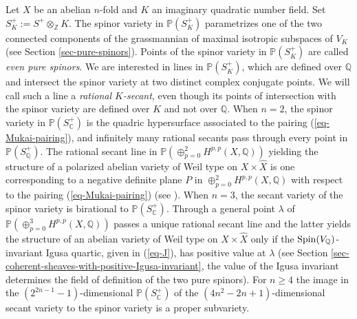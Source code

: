 \documentclass[12pt]{amsart}
\numberwithin{equation}{subsection}
\theoremstyle{plain}
\theoremstyle{definition}
\newcommand{\CC}{{\mathbb C}}
\newcommand{\QQ}{{\mathbb Q}}
\newcommand{\ZZ}{{\mathbb Z}}
\newcommand{\PP}{{\mathbb P}}
\newcommand{\Spin}{{\rm Spin}}
\begin{document}
Let $X$ be an abelian $n$-fold and $K$ an imaginary quadratic number field. Set $S^+_K:=S^+\otimes_\ZZ K$. The spinor variety in $\PP(S^+_K)$ parametrizes one of the two connected components of the grassmannian of maximal isotropic subspaces of $V_K$ (see Section \ref{sec-pure-spinors}). Points of the spinor variety in $\PP(S^+_K)$ are called {\em even pure spinors}. We are interested in lines in $\PP(S^+_K)$, which are defined over $\QQ$ and intersect the spinor variety at two distinct complex conjugate points. We will call such a line a {\em rational $K$-secant}, even though its points of intersection with the spinor variety are defined over $K$ and not over $\QQ$. 
When $n=2$, the spinor variety in $\PP(S^+_\CC)$ is the quadric hypersurface associated to the pairing (\ref{eq-Mukai-pairing}), and infinitely many rational secants pass through every point in $\PP(S^+_\QQ)$. The rational secant line in 
$\PP(\oplus_{p=0}^2H^{p,p}(X,\QQ))$ yielding the structure of a polarized abelian variety of Weil type on $X\times\hat{X}$ is one corresponding to a negative definite plane $P$ in $\oplus_{p=0}^2H^{p,p}(X,\QQ)$ with respect to the pairing (\ref{eq-Mukai-pairing}) (see \cite{markman-generalized-kummers}).
When $n=3$, the secant variety of the spinor variety is birational to $\PP(S^+_\CC)$. Through a general point $\lambda$ of 
$\PP(\oplus_{p=0}^3H^{p,p}(X,\QQ))$ passes a unique rational secant line and the latter yields the structure of an abelian variety of Weil type on $X\times\hat{X}$ only if the $\Spin(V_\QQ)$-invariant Igusa quartic, given in (\ref{eq-J}), has positive value at $\lambda$ (see Section \ref{sec-coherent-sheaves-with-positive-Igusa-invariant}, the value of the Igusa invariant determines the field of definition of the two pure spinors). For $n\geq 4$ the image in the $(2^{2n-1}-1)$-dimensional $\PP(S^+_\CC)$ of the $(4n^2-2n+1)$-dimensional
secant variety to the spinor variety is a proper subvariety. 
\end{document}
